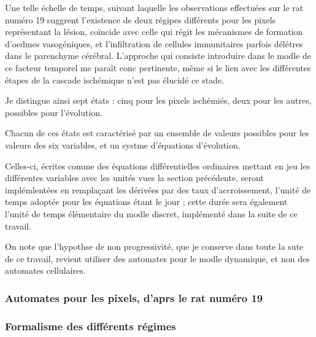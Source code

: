 \par
Une telle \'echelle de temps, suivant laquelle les observations effectu\'ees sur le rat num\'ero 19 %
suggrent l'existence de deux r\'egipes diff\'erents pour les pixels repr\'esentant la l\'esion, %
co\"incide avec celle qui r\'egit les m\'ecanismes de formation d'oedmes vasog\'eniques, %
et l'infiltration de cellules immunitaires parfois d\'el\'etres dans le parenchyme c\'er\'ebral. %
L'approche qui consiste  introduire dans le modle de ce facteur temporel me para\^it conc pertinente, %
m\^eme si le lien avec les diff\'erentes \'etapes de la cascade isch\'emique n'est pas \'elucid\'e  ce stade.

\ligneinter
Je distingue ainsi sept \'etats : cinq pour les pixels isch\'emi\'es, deux pour les autres, possibles pour l'\'evolution.

\par
Chacun de ces \'etats est caract\'eris\'e par un ensemble de valeurs possibles pour les valeurs des six variables, %
et un systme d'\'equations d'\'evolution.

\par
Celles-ci, \'ecrites comme des \'equations diff\'erentielles ordinaires mettant en jeu les diff\'erentes variables avec les unit\'es vues  la section pr\'ec\'edente, %
seront impl\'emlent\'ees en rempla\c cant les d\'eriv\'ees par des taux d'accroissement, l'unit\'e de temps adopt\'ee pour les \'equations \'etant le jour ; %
cette dur\'ee sera \'egalement l'unit\'e de temps \'el\'ementaire du modle discret, impl\'ement\'e dans la suite de ce travail.

\etoile
On note que l'hypothse de non progressivit\'e, que je conserve dans toute la sute de ce travail, %
revient  utiliser des automates pour le modle dynamique, et non des automates cellulaires. %


\subsubsection{Automates pour les pixels, d'aprs le rat num\'ero 19}





\subsubsection{Formalisme des diff\'erents r\'egimes}

